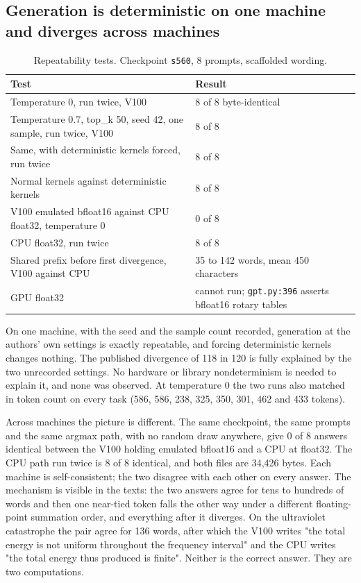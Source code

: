 \documentclass[reprint,prx,amsmath,amssymb,aps,superscriptaddress]{revtex4-2}
\begin{document}
\subsection{Generation is deterministic on one machine and diverges across machines}

\begin{table}[t]
\caption{Repeatability tests. Checkpoint \texttt{s560}, 8 prompts, scaffolded wording.}
\begin{ruledtabular}
\begin{tabular}{lll}
Test & Result &  \\
\hline
Temperature 0, run twice, V100 & 8 of 8 byte-identical &  \\
Temperature 0.7, top\_k 50, seed 42, one sample, run twice, V100 & 8 of 8 &  \\
Same, with deterministic kernels forced, run twice & 8 of 8 &  \\
Normal kernels against deterministic kernels & 8 of 8 &  \\
V100 emulated bfloat16 against CPU float32, temperature 0 & 0 of 8 &  \\
CPU float32, run twice & 8 of 8 &  \\
Shared prefix before first divergence, V100 against CPU & 35 to 142 words, mean 450 characters &  \\
GPU float32 & cannot run; \texttt{gpt.py:396} asserts bfloat16 rotary tables &  \\
\end{tabular}
\end{ruledtabular}
\end{table}

On one machine, with the seed and the sample count recorded, generation at the authors' own settings is exactly repeatable, and forcing deterministic kernels changes nothing. The published divergence of 118 in 120 is fully explained by the two unrecorded settings. No hardware or library nondeterminism is needed to explain it, and none was observed. At temperature 0 the two runs also matched in token count on every task (586, 586, 238, 325, 350, 301, 462 and 433 tokens).

Across machines the picture is different. The same checkpoint, the same prompts and the same argmax path, with no random draw anywhere, give 0 of 8 answers identical between the V100 holding emulated bfloat16 and a CPU at float32. The CPU path run twice is 8 of 8 identical, and both files are 34,426 bytes. Each machine is self-consistent; the two disagree with each other on every answer. The mechanism is visible in the texts: the two answers agree for tens to hundreds of words and then one near-tied token falls the other way under a different floating-point summation order, and everything after it diverges. On the ultraviolet catastrophe the pair agree for 136 words, after which the V100 writes "the total energy is not uniform throughout the frequency interval" and the CPU writes "the total energy thus produced is finite". Neither is the correct answer. They are two computations.
\end{document}
